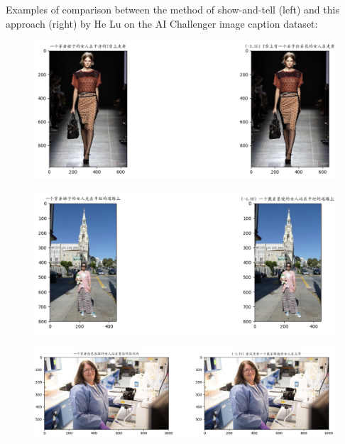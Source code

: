 \documentclass[12pt]{article}
\begin{document}
	Examples of comparison between the method of show-and-tell (left) and this approach (right) by He Lu on the AI Challenger image caption dataset:
	\begin{figure}[H]
		\centering
		\includegraphics[width=\linewidth]{figures/comparison-1}
	\end{figure}
	\begin{figure}[H]
		\centering
		\includegraphics[width=\linewidth]{figures/comparison-2}
	\end{figure}
	\begin{figure}[H]
		\centering
		\includegraphics[width=\linewidth]{figures/comparison-3}
	\end{figure}
	
\end{document}
